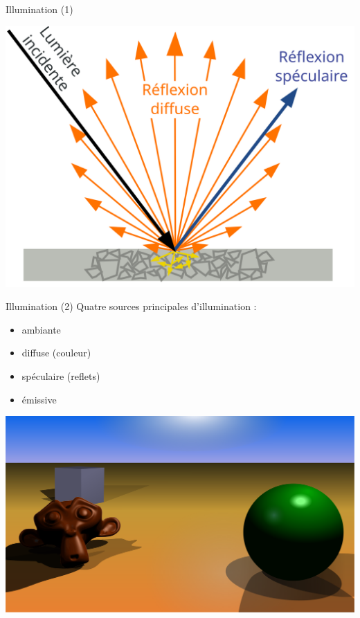 \documentclass[compress]{beamer}
\begin{document}
\begin{frame}{Illumination (1)}

    \begin{center}
        \includegraphics[width=0.8\linewidth]{diffuse_light}
    \end{center}

\end{frame}

\begin{frame}{Illumination (2)}
    Quatre sources principales d'illumination :

    \begin{itemize}
        \item {\Medium ambiante}
        \item {\Medium diffuse} (couleur)
        \item {\Medium spéculaire} (reflets)
        \item {\Medium émissive}
    \end{itemize}

    \begin{center}
        \includegraphics[width=0.6\linewidth]{3dscene}
    \end{center}
\end{frame}
\end{document}
